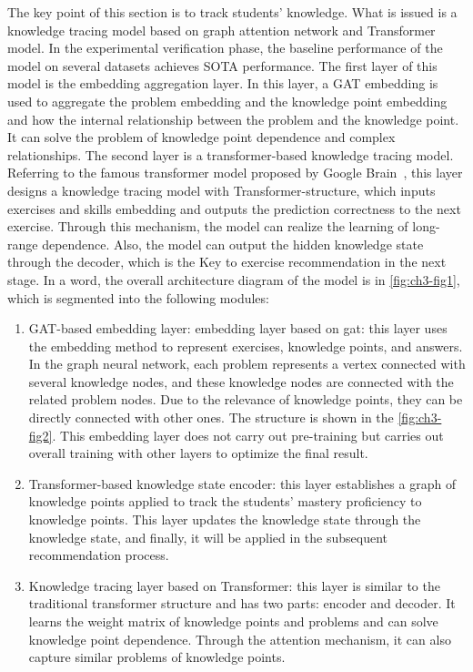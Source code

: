 The key point of this section is to track students' knowledge. What is issued is a knowledge tracing model based on graph attention network and Transformer model. In the experimental verification phase, the baseline performance of the model on several datasets achieves SOTA performance. The first layer of this model is the embedding aggregation layer. In this layer, a GAT embedding is used to aggregate the problem embedding and the knowledge point embedding and how the internal relationship between the problem and the knowledge point. It can solve the problem of knowledge point dependence and complex relationships. The second layer is a transformer-based knowledge tracing model. Referring to the famous transformer model proposed by Google Brain~\cite{vaswani2017attention}, this layer designs a knowledge tracing model with Transformer-structure, which inputs exercises and skills embedding and outputs the prediction correctness to the next exercise. Through this mechanism, the model can realize the learning of long-range dependence. Also, the model can output the hidden knowledge state through the decoder, which is the Key to exercise recommendation in the next stage. In a word, the overall architecture diagram of the model is in \figurename{\ref{fig:ch3-fig1}}, which is segmented into the following modules:
\begin{enumerate}
    \item GAT-based embedding layer: embedding layer based on gat: this layer uses the embedding method to represent exercises, knowledge points, and answers. In the graph neural network, each problem represents a vertex connected with several knowledge nodes, and these knowledge nodes are connected with the related problem nodes. Due to the relevance of knowledge points, they can be directly connected with other ones. The structure is shown in the \figurename{\ref{fig:ch3-fig2}}. This embedding layer does not carry out pre-training but carries out overall training with other layers to optimize the final result.
    \item Transformer-based knowledge state encoder: this layer establishes a graph of knowledge points applied to track the students' mastery proficiency to knowledge points. This layer updates the knowledge state through the knowledge state, and finally, it will be applied in the subsequent recommendation process.
    \item Knowledge tracing layer based on Transformer: this layer is similar to the traditional transformer structure and has two parts: encoder and decoder. It learns the weight matrix of knowledge points and problems and can solve knowledge point dependence. Through the attention mechanism, it can also capture similar problems of knowledge points.
\end{enumerate}

